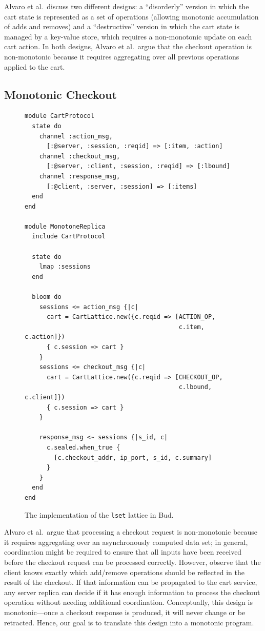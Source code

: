 Alvaro et al.\ discuss two different designs: a ``disorderly'' version in which
the cart state is represented as a set of operations (allowing monotonic
accumulation of adds and removes) and a ``destructive'' version in which the
cart state is managed by a key-value store, which requires a non-monotonic
update on each cart action. In both designs, Alvaro et al.\ argue that the
checkout operation is non-monotonic because it requires aggregating over all
previous operations applied to the cart.

\subsection{Monotonic Checkout}
\begin{figure}[t]
\begin{scriptsize}

\begin{lstlisting}
module CartProtocol
  state do
    channel :action_msg,
      [:@server, :session, :reqid] => [:item, :action]
    channel :checkout_msg,
      [:@server, :client, :session, :reqid] => [:lbound]
    channel :response_msg,
      [:@client, :server, :session] => [:items]
  end
end

module MonotoneReplica
  include CartProtocol

  state do
    lmap :sessions
  end

  bloom do
    sessions <= action_msg {|c|
      cart = CartLattice.new({c.reqid => [ACTION_OP,
                                          c.item, c.action]})
      { c.session => cart }
    }
    sessions <= checkout_msg {|c|
      cart = CartLattice.new({c.reqid => [CHECKOUT_OP,
                                          c.lbound, c.client]})
      { c.session => cart }
    }

    response_msg <~ sessions {|s_id, c|
      c.sealed.when_true {
        [c.checkout_addr, ip_port, s_id, c.summary]
      }
    }
  end
end
\end{lstlisting}
\end{scriptsize}
\caption{The implementation of the \texttt{lset} lattice in Bud.}
\label{fig:monotone-cart}
\end{figure}

Alvaro et al.\ argue that processing a checkout request is non-monotonic because
it requires aggregating over an asynchronously computed data set; in general,
coordination might be required to ensure that all inputs have been received
before the checkout request can be processed correctly. However, observe that
the client knows exactly which add/remove operations should be reflected in the
result of the checkout. If that information can be propagated to the cart
service, any server replica can decide if it has enough information to process
the checkout operation without needing additional coordination. Conceptually,
this design is monotonic---once a checkout response is produced, it will never
change or be retracted. Hence, our goal is to translate this design into a
monotonic \lang program.

